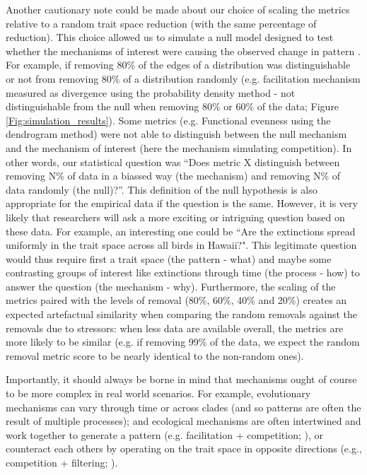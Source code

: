 \documentclass[12pt,letterpaper]{article}
\begin{document}
Another cautionary note could be made about our choice of scaling the metrics relative to a random trait space reduction (with the same percentage of reduction).
This choice allowed us to simulate a null model designed to test whether the mechanisms of interest were causing the observed change in pattern \citep{bausman2018modeling}.
For example, if removing 80\% of the edges of a distribution was distinguishable or not from removing 80\% of a distribution randomly (e.g. facilitation mechanism measured as divergence using the probability density method - not distinguishable from the null when removing 80\% or 60\% of the data; Figure \ref{Fig:simulation_results}).
Some metrics (e.g. Functional evenness using the dendrogram method) were not able to distinguish between the null mechanism and the mechanism of interest (here the mechanism simulating competition).
In other words, our statistical question was ``Does metric X distinguish between removing N\% of data in a biassed way (the mechanism) and removing N\% of data randomly (the null)?''.
This definition of the null hypothesis is also appropriate for the empirical data if the question is the same.
However, it is very likely that researchers will ask a more exciting or intriguing question based on these data.
For example, an interesting one could be ``Are the extinctions spread uniformly in the trait space across all birds in Hawaii?".
This legitimate question would thus require first a trait space (the pattern - what) and maybe some contrasting groups of interest like extinctions through time (the process - how) to answer the question (the mechanism - why).
Furthermore, the scaling of the metrics paired with the levels of removal (80\%, 60\%, 40\% and 20\%) creates an expected artefactual similarity when comparing the random removals against the removals due to stressors: when less data are available overall, the metrics are more likely to be similar (e.g. if removing 99\% of the data, we expect the random removal metric score to be nearly identical to the non-random ones).

Importantly, it should always be borne in mind that mechanisms ought of course to be more complex in real world scenarios.
For example, evolutionary mechanisms can vary through time or across clades (and so patterns are often the result of multiple processes); and ecological mechanisms are often intertwined and work together to generate a pattern (e.g. facilitation + competition; \citealt{danet2024species}), or counteract each others by operating on the trait space in opposite directions (e.g., competition + filtering; \citealt{mammola2024functional}).
\end{document}
